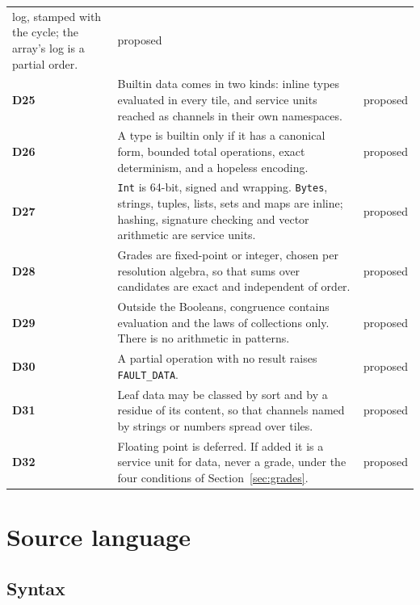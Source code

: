 \documentclass[10.5pt,a4paper]{extarticle}
\newcommand{\kw}[1]{\texttt{#1}}
\newcommand{\dec}[1]{\textbf{D#1}}
\newcommand{\prop}{proposed}
\theoremstyle{definition}
\theoremstyle{remark}
\begin{document}
\begin{tabularx}{\textwidth}{@{}l X c@{}}
          log, stamped with the cycle; the array's log is a partial order. & \prop\\
\dec{25} & Builtin data comes in two kinds: inline types evaluated in every
          tile, and service units reached as channels in their own
          namespaces. & \prop\\
\dec{26} & A type is builtin only if it has a canonical form, bounded total
          operations, exact determinism, and a hopeless encoding. & \prop\\
\dec{27} & \kw{Int} is 64-bit, signed and wrapping. \kw{Bytes}, strings,
          tuples, lists, sets and maps are inline; hashing, signature
          checking and vector arithmetic are service units. & \prop\\
\dec{28} & Grades are fixed-point or integer, chosen per resolution algebra,
          so that sums over candidates are exact and independent of order. & \prop\\
\dec{29} & Outside the Booleans, congruence contains evaluation and the
          laws of collections only. There is no arithmetic in patterns. & \prop\\
\dec{30} & A partial operation with no result raises \kw{FAULT\_DATA}. & \prop\\
\dec{31} & Leaf data may be classed by sort and by a residue of its content,
          so that channels named by strings or numbers spread over tiles. & \prop\\
\dec{32} & Floating point is deferred. If added it is a service unit for
          data, never a grade, under the four conditions of
          Section~\ref{sec:grades}. & \prop\\
\bottomrule
\end{tabularx}

\clearpage
\section{Source language}\label{sec:source}

\subsection{Syntax}
\end{document}
